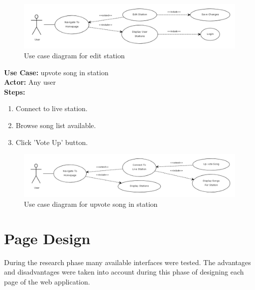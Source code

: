 \documentclass[a4paper, 12pt]{report}
\begin{document}
\begin{figure}[!htbp]
  \centering
    \includegraphics[width=1.0\textwidth]{usecase3.png}
    \caption{Use case diagram for edit station}
\end{figure}
\textbf{Use Case:} upvote song in station\\
\textbf{Actor:} Any user\\
\textbf{Steps:} 
\begin{enumerate}
\item Connect to live station.
\item Browse song list available.
\item Click 'Vote Up' button.
\end{enumerate}
\begin{figure}[!htbp]
  \centering
    \includegraphics[width=1.0\textwidth]{usecase4.png}
    \caption{Use case diagram for upvote song in station }
\end{figure}

\section{Page Design}
During the research phase many available interfaces were tested. The advantages and disadvantages were taken into account during this phase of designing each page of the web application.
\end{document}
